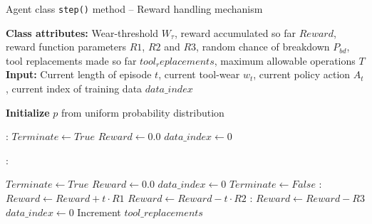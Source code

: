\documentclass[a4paper, 12pt]{article}
\begin{document}
\begin{algorithm}[h]
	\onehalfspacing
	\caption{Agent class \texttt{step()} method -- Reward handling mechanism}\label{alg:SSStep}
	\begin{algorithmic}[1]
		\newline
		\textbf{Class attributes:} Wear-threshold $W_\tau$, reward accumulated so far $Reward$, reward function parameters $R1$, $R2$ and $R3$, random chance of breakdown $P_{bd}$, tool replacements made so far $tool_replacements$, maximum allowable operations $T$\newline
		\textbf{Input:} Current length of episode $t$, current tool-wear $w_t$, current policy action $A_t$,  current index of training data $data\_index$ \newline
		
		\State \textbf{Initialize} $p$ from uniform probability distribution
		
		:
			\State $Terminate \gets True$
			\State $Reward \gets 0.0$
			\State $data\_index \gets 0$	\newline
			
				
		:
		
				\State $Terminate \gets True$
				\State $Reward \gets 0.0$
				\State $data\_index \gets 0$		
		\Else
			\State $Terminate \gets False$
			:
					\State $Reward \gets Reward + t \cdot R1$
			\Else
				\State $Reward \gets Reward - t \cdot R2$	
			\EndIf
			:
				\State $Reward \gets Reward - R3$
				\State $data\_index \gets 0$ 
				\State Increment $tool\_replacements$
			\EndIf			
		\EndIf
		\EndProcedure
	\end{algorithmic}
\end{algorithm}
\end{document}
